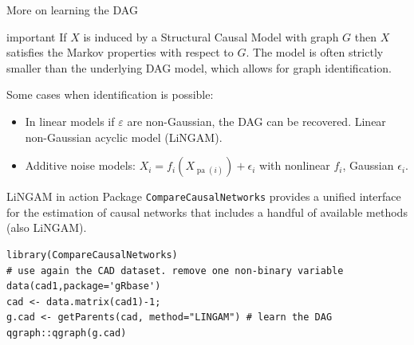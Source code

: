 \documentclass[dvipsnames,aspectratio=169]{beamer} %
\DeclareMathOperator{\pa}{pa}
\begin{document}


%

\begin{frame}{More on learning the DAG}
\begin{beamercolorbox}[wd=\paperwidth,sep=5pt]{important}
If $X$ is induced by a Structural Causal Model with graph $G$ then $X$ satisfies the Markov properties with respect to $G$. The model is often strictly smaller	than the underlying DAG model, which allows for graph identification. 
\end{beamercolorbox}
\bigskip

Some cases when identification is possible:
\begin{itemize}
	\item In linear models if $\varepsilon$ are non-Gaussian, the DAG can be recovered. Linear non-Gaussian acyclic model (\alert{LiNGAM}).
	\item Additive noise models: $X_i=f_i(X_{\pa(i)})+\epsilon_i$ with nonlinear $f_i$, Gaussian $\epsilon_i$. 
\end{itemize}
\end{frame}

\begin{frame}[fragile]{LiNGAM in action}
	Package \texttt{CompareCausalNetworks} provides a unified interface for the estimation of causal networks that includes a handful of available methods (also LiNGAM).\\[.3cm]
		\begin{lstlisting}
library(CompareCausalNetworks)
# use again the CAD dataset. remove one non-binary variable
data(cad1,package='gRbase')
cad <- data.matrix(cad1)-1; 
g.cad <- getParents(cad, method="LINGAM") # learn the DAG
qgraph::qgraph(g.cad)
 \end{lstlisting}

\end{frame}
\end{document}

